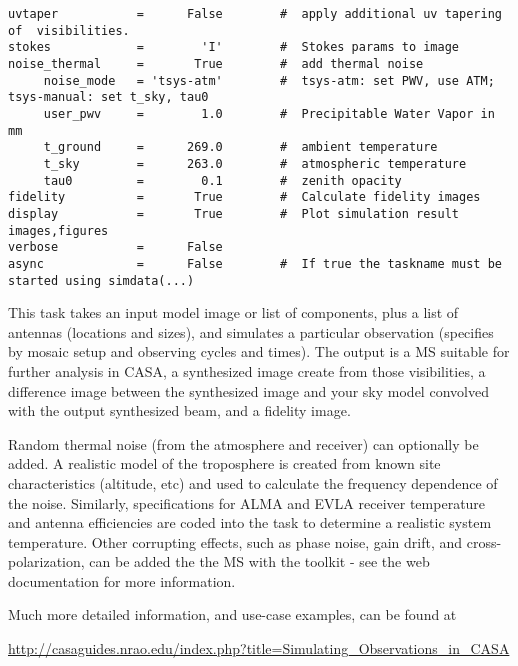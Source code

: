 \begin{verbatim}
uvtaper           =      False        #  apply additional uv tapering of  visibilities.
stokes            =        'I'        #  Stokes params to image
noise_thermal     =       True        #  add thermal noise
     noise_mode   = 'tsys-atm'        #  tsys-atm: set PWV, use ATM; tsys-manual: set t_sky, tau0
     user_pwv     =        1.0        #  Precipitable Water Vapor in mm
     t_ground     =      269.0        #  ambient temperature
     t_sky        =      263.0        #  atmospheric temperature
     tau0         =        0.1        #  zenith opacity
fidelity          =       True        #  Calculate fidelity images
display           =       True        #  Plot simulation result images,figures
verbose           =      False        
async             =      False        #  If true the taskname must be started using simdata(...)
\end{verbatim}
\normalsize

This task takes an input model image or list of components, plus a
list of antennas (locations and sizes), and simulates a particular
observation (specifies by mosaic setup and observing cycles and
times).  The output is a MS suitable for further analysis in CASA, a
synthesized image create from those visibilities, a difference image
between the synthesized image and your sky model convolved with the
output synthesized beam, and a fidelity image.

Random thermal noise (from the atmosphere and receiver) can optionally
be added. A realistic model of the troposphere is created from known
site characteristics (altitude, etc) and used to calculate the
frequency dependence of the noise.  Similarly, specifications for ALMA
and EVLA receiver temperature and antenna efficiencies are coded into
the task to determine a realistic system temperature.  Other
corrupting effects, such as phase noise, gain drift, and
cross-polarization, can be added the the MS with the toolkit - see the
web documentation for more information.

Much more detailed information, and use-case examples, can be found at 

\url{http://casaguides.nrao.edu/index.php?title=Simulating_Observations_in_CASA}

